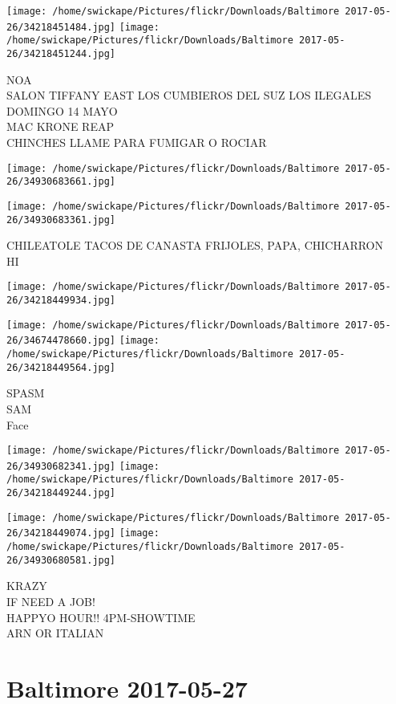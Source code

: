 \documentclass[10pt,letterpaper]{article}
\begin{document}
\texttt{[image: /home/swickape/Pictures/flickr/Downloads/Baltimore 2017-05-26/34218451484.jpg]}
\texttt{[image: /home/swickape/Pictures/flickr/Downloads/Baltimore 2017-05-26/34218451244.jpg]}

NOA\\
SALON TIFFANY EAST LOS CUMBIEROS DEL SUZ LOS ILEGALES DOMINGO 14 MAYO\\
MAC KRONE REAP\\
CHINCHES LLAME PARA FUMIGAR O ROCIAR
\pagebreak

\texttt{[image: /home/swickape/Pictures/flickr/Downloads/Baltimore 2017-05-26/34930683661.jpg]}

\vspace{0.25in}
\texttt{[image: /home/swickape/Pictures/flickr/Downloads/Baltimore 2017-05-26/34930683361.jpg]}

CHILEATOLE TACOS DE CANASTA FRIJOLES, PAPA, CHICHARRON\\
HI
\pagebreak

\texttt{[image: /home/swickape/Pictures/flickr/Downloads/Baltimore 2017-05-26/34218449934.jpg]}

\vspace{0.25in}
\texttt{[image: /home/swickape/Pictures/flickr/Downloads/Baltimore 2017-05-26/34674478660.jpg]}
\texttt{[image: /home/swickape/Pictures/flickr/Downloads/Baltimore 2017-05-26/34218449564.jpg]}

SPASM\\
SAM\\
Face
\pagebreak

\texttt{[image: /home/swickape/Pictures/flickr/Downloads/Baltimore 2017-05-26/34930682341.jpg]}
\texttt{[image: /home/swickape/Pictures/flickr/Downloads/Baltimore 2017-05-26/34218449244.jpg]}

\texttt{[image: /home/swickape/Pictures/flickr/Downloads/Baltimore 2017-05-26/34218449074.jpg]}
\texttt{[image: /home/swickape/Pictures/flickr/Downloads/Baltimore 2017-05-26/34930680581.jpg]}

KRAZY\\
IF NEED A JOB!\\
HAPPYO HOUR!! 4PM{-}SHOWTIME\\
ARN OR ITALIAN
\pagebreak

\section*{Baltimore 2017-05-27}
\end{document}
